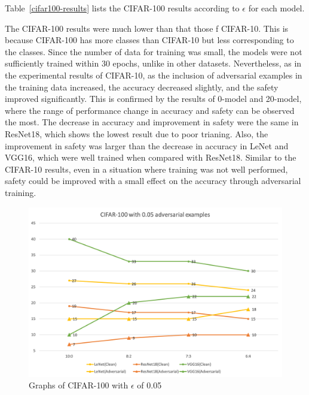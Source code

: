 \documentclass[journal,article,submit,moreauthors,pdftex]{Definitions/mdpi}
\begin{document}
Table~\ref{cifar100-results} lists the CIFAR-100 results according to \begin{math}\epsilon\end{math} for each model.

The CIFAR-100 results were much lower than that those f CIFAR-10.
This is because CIFAR-100 has more classes than CIFAR-10 but less corresponding to the classes. Since the number of data for training was small, the models were not sufficiently trained within 30 epochs, unlike in other datasets. 
Nevertheless, as in the experimental results of CIFAR-10, as the inclusion of adversarial examples in the training data increased, the accuracy decreased slightly, and the safety improved significantly.
This is confirmed by the results of 0-model and 20-model, where the range of performance change in accuracy and safety can be observed the most.
The decrease in accuracy and improvement in safety were the same in ResNet18, which shows the lowest result due to poor trianing.
Also, the improvement in safety was larger than the decrease in accuracy in LeNet and VGG16, which were well trained when compared with ResNet18.
Similar to the CIFAR-10 results, even in a situation where training was not well performed, safety could be improved with a small effect on the accuracy through adversarial training.

\begin{figure}[H]
    \includegraphics[width=13 cm]{Definitions/graph-005cifar100.png}
    \caption{Graphs of CIFAR-100 with \begin{math}\epsilon\end{math} of 0.05\label{cifar100-0.05-graph}}
\end{figure} 
\end{document}

